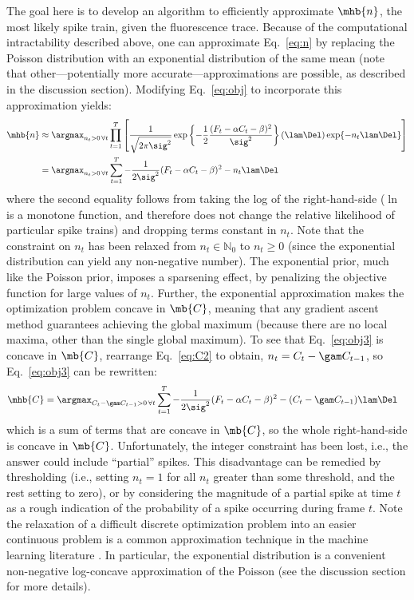 The goal here is to develop an algorithm to efficiently approximate $\mhb{n}$, the most likely spike train, given the fluorescence trace. Because of the computational intractability described above, one can approximate Eq.~\eqref{eq:n} by replacing the Poisson distribution with an exponential distribution of the same mean (note that other---potentially more accurate---approximations are possible, as described in the discussion section). Modifying Eq.~\eqref{eq:obj} to incorporate this approximation yields:
\begin{subequations}
\begin{align} \label{eq:obj2}
\mhb{n} &\approx \argmax_{n_t>0 \, \forall t} \prod_{t=1}^T  \left[\frac{1}{\sqrt{2 \pi \sig^2}} \exp \left\{-\frac{1}{2}\frac{(F_t - \alpha C_t - \beta)^2}{\sig^2}\right\}  (\lam\Del) \exp\{-n_t \lam\Del \}\right]
\\ &= \argmax_{n_t>0 \, \forall t}  \sum_{t=1}^T -\frac{1}{2 \sig^2}(F_t - \alpha C_t - \beta)^2  - n_t \lam \Del  \label{eq:obj3}
\end{align}
\end{subequations}
where the second equality follows from taking the log of the right-hand-side ($\ln$ is a monotone function, and therefore does not change the relative likelihood of particular spike trains) and dropping terms constant in $n_t$.  Note that the constraint on $n_t$ has been relaxed from  $n_t \in \mathbb{N}_0$ to $n_t \geq 0$ (since the exponential distribution can yield any non-negative number).  The exponential prior, much like the Poisson prior, imposes a sparsening effect, by penalizing the objective function for large values of $n_t$. Further, the exponential approximation makes the optimization problem concave in $\mb{C}$, meaning that any gradient ascent method guarantees achieving the global maximum (because there are no local maxima, other than the single global maximum).  To see that Eq.~\eqref{eq:obj3} is concave in $\mb{C}$, rearrange Eq.~\eqref{eq:C2} to obtain, $n_t=C_t-\gam C_{t-1}$, so Eq.~\eqref{eq:obj3} can be rewritten:
\begin{align}
\mhb{C} &= \argmax_{C_t-\gam C_{t-1}>0 \, \forall t}  \sum_{t=1}^T -\frac{1}{2 \sig^2}(F_t - \alpha C_t - \beta)^2  - (C_t -\gam C_{t-1}) \lam \Del  \label{eq:obj4}
\end{align}
\noindent which is a sum of terms that are concave in $\mb{C}$, so the whole right-hand-side is concave in $\mb{C}$. Unfortunately, the integer constraint has been lost, i.e.,  the answer could include ``partial'' spikes.  This disadvantage can be remedied by thresholding (i.e., setting $n_t=1$ for all $n_t$ greater than some threshold, and the rest setting to zero), or by considering the magnitude of a partial spike at time $t$ as a rough indication of the probability of a spike occurring during frame $t$. Note the relaxation of a difficult discrete optimization problem into an easier continuous problem is a common approximation technique in the machine learning literature \cite{CONV04, PaninskiWu09}.  In particular, the exponential distribution is a convenient non-negative log-concave approximation of the Poisson (see the discussion section for more details). 

